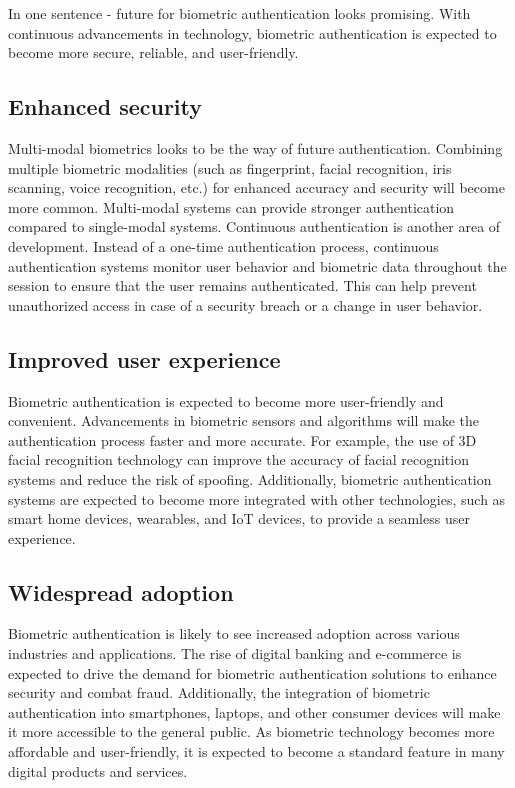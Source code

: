 \hspace{1 em} In one sentence - future for biometric authentication looks promising. 
With continuous advancements in technology, biometric authentication is expected to become more secure, reliable, and user-friendly.
\subsection{Enhanced security}
\hspace{1 em} Multi-modal biometrics looks to be the way of future authentication. Combining multiple biometric modalities (such as fingerprint, facial recognition, iris scanning, voice recognition, etc.) for enhanced accuracy and security will become more common. Multi-modal 
systems can provide stronger authentication compared to single-modal systems. 
Continuous authentication is another area of development. Instead of a one-time
authentication process, continuous authentication systems monitor user behavior
and biometric data throughout the session to ensure that the user remains
authenticated. This can help prevent unauthorized access in case of a security
breach or a change in user behavior.
\subsection{Improved user experience}
\hspace{1 em} Biometric authentication is expected to become more user-friendly and
convenient. Advancements in biometric sensors and algorithms will make the
authentication process faster and more accurate. For example, the use of 3D facial
recognition technology can improve the accuracy of facial recognition systems and
reduce the risk of spoofing. Additionally, biometric authentication systems are
expected to become more integrated with other technologies, such as smart home
devices, wearables, and IoT devices, to provide a seamless user experience.
\subsection{Widespread adoption}
\hspace{1 em} Biometric authentication is likely to see increased adoption across various
industries and applications. The rise of digital banking and e-commerce is expected
to drive the demand for biometric authentication solutions to enhance security and
combat fraud. Additionally, the integration of biometric authentication into
smartphones, laptops, and other consumer devices will make it more accessible to
the general public. As biometric technology becomes more affordable and
user-friendly, it is expected to become a standard feature in many digital products
and services.
